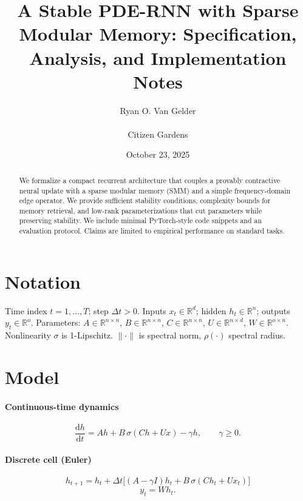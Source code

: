 \documentclass[11pt]{article}
\title{A Stable PDE-RNN with Sparse Modular Memory: Specification, Analysis, and Implementation Notes}
\author{Ryan O. Van Gelder \\ \\ Citizen Gardens}
\date{October 23, 2025}
\begin{document}
\maketitle
\begin{abstract}
We formalize a compact recurrent architecture that couples a provably contractive neural update with a sparse modular memory (SMM) and a simple frequency-domain edge operator. We provide sufficient stability conditions, complexity bounds for memory retrieval, and low-rank parameterizations that cut parameters while preserving stability. We include minimal PyTorch-style code snippets and an evaluation protocol. Claims are limited to empirical performance on standard tasks.
\end{abstract}

\section{Notation}
Time index $t=1,\dots,T$; step $\Delta t>0$. Inputs $x_t\in\mathbb R^{d}$; hidden $h_t\in\mathbb R^{n}$; outputs $y_t\in\mathbb R^{o}$. Parameters: $A\in\mathbb R^{n\times n}$, $B\in\mathbb R^{n\times n}$, $C\in\mathbb R^{n\times n}$, $U\in\mathbb R^{n\times d}$, $W\in\mathbb R^{o\times n}$. Nonlinearity $\sigma$ is 1-Lipschitz. $\|\cdot\|$ is spectral norm, $\rho(\cdot)$ spectral radius.

\section{Model}
\paragraph{Continuous-time dynamics}
\begin{equation}
\frac{\mathrm d h}{\mathrm d t} = A h + B\,\sigma(C h + U x) - \gamma h, \qquad \gamma\ge 0.
\end{equation}
\paragraph{Discrete cell (Euler)}
\begin{equation}\label{eq:r1}
\boxed{\ h_{t+1}=h_t + \Delta t\big[(A-\gamma I) h_t + B\,\sigma(C h_t + U x_t)\big]\ }
\end{equation}
\begin{equation}\label{eq:r2}
\boxed{\ y_t = W h_t.\ }
\end{equation}
\end{document}
